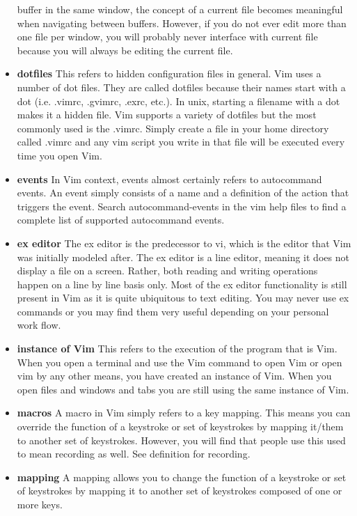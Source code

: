 \documentclass[12pt, oneside]{book}
\begin{document}
\begin{itemize}[leftmargin=*, label={}]
    buffer in the same window, the concept of a current file becomes meaningful when navigating between buffers.  However, if you do not ever edit more than one file per window, you will probably never
    interface with current file because you will always be editing the current file.
  \item \textbf{dotfiles} This refers to hidden configuration files in general.  Vim uses a number of dot files.  They are called dotfiles because their names start with a dot (i.e. .vimrc, .gvimrc,
    .exrc, etc.).  In unix, starting a filename with a dot makes it a hidden file.  Vim supports a variety of dotfiles but the most commonly used is the .vimrc.  Simply create a file in your home
    directory called .vimrc and any vim script you write in that file will be executed every time you open Vim.
  \item \textbf{events} In Vim context, events almost certainly refers to autocommand events.  An event simply consists of a name and a definition of the action that triggers the event.  Search autocommand-events in the vim help files to find a complete list of supported autocommand events.
  \item \textbf{ex editor} The ex editor is the predecessor to vi, which is the editor that Vim was initially modeled after.  The ex editor is a line editor, meaning it does not display a file on a
    screen.  Rather, both reading and writing operations happen on a line by line basis only.  Most of the ex editor functionality is still present in Vim as it is quite ubiquitous to text editing.
    You may never use ex commands or you may find them very useful depending on your personal work flow.
  \item \textbf{instance of Vim} This refers to the execution of the program that is Vim.  When you open a terminal and use the Vim command to open Vim or open vim by any other means, you have created
    an instance of Vim.  When you open files and windows and tabs you are still using the same instance of Vim.
  \item \textbf{macros} A macro in Vim simply refers to a key mapping.  This means you can override the function of a keystroke or set of keystrokes by mapping it/them to another set of
    keystrokes. However, you will find that people use this used to mean recording as well.  See definition for recording.
  \item \textbf{mapping} A mapping allows you to change the function of a keystroke or set of keystrokes by mapping it to another set of keystrokes composed of one or more keys.

\end{itemize}
\end{document}
